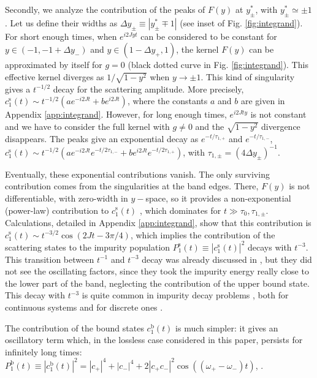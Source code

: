 \documentclass[aps,pra,twocolumn,floatfix,superscriptaddress]{revtex4-1}%
\begin{document}
{\color{blue}Secondly, we analyze the contribution of the peaks of $F(y)$ at $y_\pm^*$, with $y_\pm^*\simeq \pm 1$. Let us define their widths as $\Delta y_\pm\equiv |y_\pm^* \mp 1|$ (see inset of Fig. \ref{fig:integrand}). For short enough times, when $e^{i2Jyt}$ can be considered to be constant for $y\in (-1,-1+\Delta y_-)$ and $y\in (1-\Delta y_+,1)$, the kernel $F(y)$ can be approximated by itself for $g=0$ (black dotted curve in Fig. \ref{fig:integrand}). This effective kernel diverges as $1/\sqrt{1-y^2}$ when $y\to\pm 1$. This kind of singularity gives a $t^{-1/2}$ decay for the scattering amplitude. More precisely, $c_1^\text{s}(t)\sim t^{-1/2}(a e^{-i2Jt} + b e^{i2Jt})$, where the constants $a$ and $b$ are given in Appendix \ref{app:integrand}. However, for long enough times,  $e^{i2Jty}$ is not constant and we have to consider the full kernel with $g\neq 0$ and the  $\sqrt{1-y^2}$ divergence disappears. The peaks give an exponential decay as $e^{-t/\tau_{1,+}}$ and $e^{-t/\tau_{1,-}}$, $c_1^\text{s}(t)\sim t^{-1/2}(a e^{-i2Jt}e^{-t/2\tau_{1,-}} + b e^{i2Jt}e^{-t/2\tau_{1,+}})$, with $\tau_{1,\pm} = (4 \Delta y_\pm)^{-1}$.

Eventually, these exponential contributions vanish.  The only surviving contribution comes from the singularities at the band edges. There, $F(y)$ is not differentiable, with zero-width in $y-$space, so it provides a non-exponential (power-law) contribution to  $c_1^\text{s}(t)$ \cite{Khalfin1958,Fonda1978,Hack1982,Gaveau1995}, which dominates for  $t\gg \tau_0,\tau_{1,\pm}$. Calculations, detailed in Appendix \ref{app:integrand}, show that this contribution is $c_1^\text{s}(t)\sim t^{-3/2}\cos (2Jt-3\pi/4)$, which implies the contribution of the scattering states to the impurity population $P_1^\text{s}(t)\equiv |c_1^\text{s}(t)|^2$ decays with $t^{-3}$. This transition between $t^{-1}$ and $t^{-3}$ decay was already discussed in \cite{Garmon2013}, but they did not see the oscillating factors, since they took the impurity energy really close to the lower part of the band, neglecting the contribution of the upper bound state. This decay with $t^{-3}$ is quite common in impurity decay problems \cite{Chiu1977}, both for continuous systems \cite{Winter1961,GarciaCalderon2006} and for discrete ones \cite{Longhi2006a,Dente2008,Longhi2006b}.}


The contribution of the bound states $c_1^\text{b}(t)$ is much simpler: it gives an oscillatory term which, in the lossless case considered in this paper, persists for infinitely long times: $P_1^\text{b}(t)\equiv|c_1^\text{b}(t)|^2=|c_+|^4+|c_-|^4+2|c_+c_-|^2\cos((\omega_+-\omega_-)t)$, \cite{Gaveau1995,Lombardo2014}.
\end{document}

